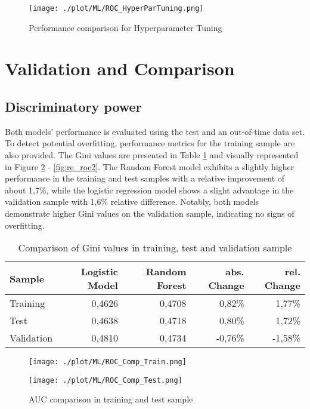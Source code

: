 \begin{figure}[H]
	\centering
	\texttt{[image: ./plot/ML/ROC\_HyperParTuning.png]}
    \caption{Performance comparison for Hyperparameter Tuning}
    \label{fig:re_rochp}
\end{figure}

\section{Validation and Comparison}
\label{sec:comp_model}

\subsection{Discriminatory power}
Both models' performance is evaluated using the test and an out-of-time data set. To detect potential overfitting, performance metrics for the training sample are also provided. The Gini values are presented in Table \ref{re_ginicomp} and visually represented in Figure \ref{fig:re_roc1} - \ref{fig:re_roc2}. The Random Forest model exhibits a slightly higher performance in the training and test samples with a relative improvement of about 1,7\%, while the logistic regression model shows a slight advantage in the validation sample with 1,6\% relative difference. Notably, both models demonstrate higher Gini values on the validation sample, indicating no signs of overfitting.

\begin{table}[H]
\centering
\begin{tabular}{lrrrr}\toprule
\textbf{Sample} & \textbf{Logistic Model} & \textbf{Random Forest} & \textbf{abs. Change} & \textbf{rel. Change}\\\midrule
Training   & 0,4626 & 0,4708 & 0,82\%  & 1,77\%  \\
Test       & 0,4638 & 0,4718 & 0,80\%  & 1,72\%  \\
Validation & 0,4810 & 0,4734 & -0,76\% & -1,58\% \\\bottomrule
\end{tabular}
\caption{Comparison of Gini values in training, test and validation sample}
\label{re_ginicomp}
\end{table}

\begin{figure}[H]
\begin{minipage}{.5\textwidth}
	\centering
	\texttt{[image: ./plot/ML/ROC\_Comp\_Train.png]}
\end{minipage}%
\begin{minipage}{.5\textwidth}
	\centering
	\texttt{[image: ./plot/ML/ROC\_Comp\_Test.png]}
\end{minipage}
    \caption{AUC comparison in training and test sample}
    \label{fig:re_roc1}
\end{figure}

